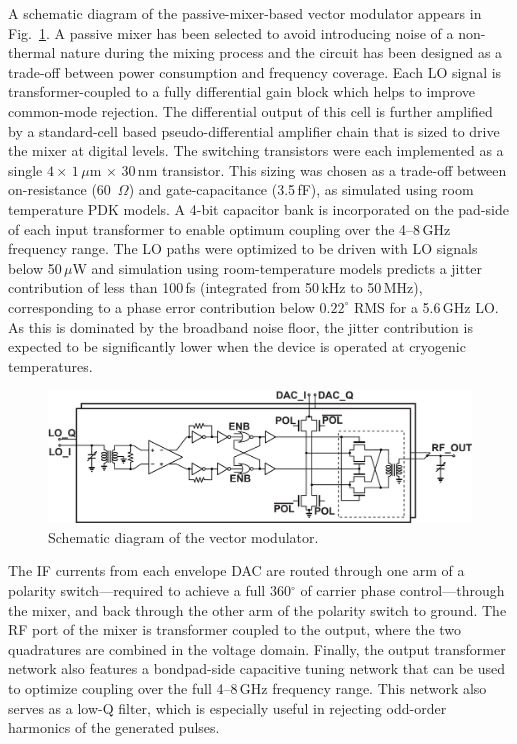 \documentclass[journal]{IEEEtran}
\newcommand{\CR}[1]{{\color{black}#1}}
\begin{document}
A schematic diagram of the passive-mixer-based vector modulator appears in Fig.~\ref{vectormod}. A passive mixer has been selected to avoid introducing noise of a non-thermal nature during the mixing process and the circuit has been designed as a trade-off between power consumption and \CR{frequency coverage}. Each LO signal is transformer-coupled to a fully differential gain block which helps to improve common-mode rejection.  The differential output of this cell is further amplified by a standard-cell based pseudo-differential amplifier chain that is sized to drive the mixer \CR{at digital levels. The switching transistors were each implemented as a single $4\times\,1\,\mu$m$\,\times\,30\,$nm transistor. This sizing was chosen as a trade-off between on-resistance (60~$\Omega$) and gate-capacitance (3.5\,fF), as simulated using room temperature PDK models.} \CR{A 4-bit capacitor bank is incorporated on the pad-side of each input transformer to enable optimum coupling over the 4--8\,GHz frequency range.} \CR{The LO paths were optimized to be driven with LO signals below 50\,$\mu$W and  simulation using room-temperature models predicts a jitter contribution of less than 100\,fs (integrated from 50\,kHz to 50\,MHz), corresponding to a phase error contribution below $0.22^\circ$ RMS for a 5.6\,GHz LO. As this is dominated by the broadband noise floor, the jitter contribution is expected to be significantly lower when the device is operated at cryogenic temperatures}. 
\begin{figure}[bt!] 
\includegraphics[width=\columnwidth]{Figures/FIGURE_10}
\caption{Schematic diagram of the vector modulator.}\label{vectormod}
\end{figure}

The IF currents from each envelope DAC are routed through one arm of a polarity switch---required to achieve a full 360$^\circ$ of carrier phase control---through the mixer, and back through the other arm of the polarity switch to ground. The \CR{RF port} of the mixer is transformer coupled to the output, where the two quadratures are combined in the voltage domain. Finally,  \CR{the output transformer network} also features a bondpad-side capacitive tuning network that can be used to optimize coupling over the full 4--8\,GHz frequency range. \CR{This network also serves as a low-Q filter, which is especially useful in rejecting odd-order harmonics of the generated pulses.}
\end{document}
